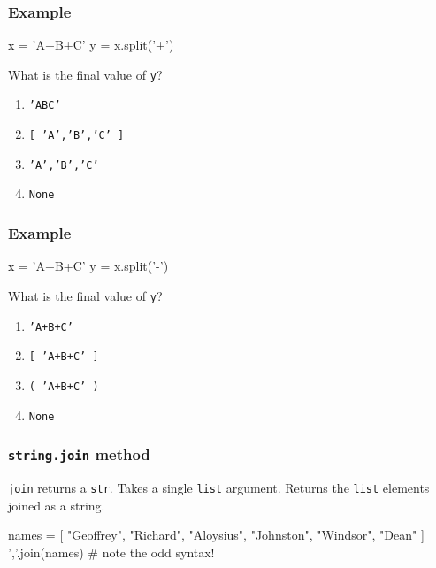 \documentclass[11pt]{beamer}
\begin{document}
\begin{frame}[fragile]
  \frametitle{Example}
  \Enlarge

  \begin{semiverbatim}
x = 'A+B+C'
y = x.split('+')
  \end{semiverbatim}
  What is the final value of \texttt{y}?
  \begin{enumerate}[label=\Alph*]
  \item  \texttt{'ABC'}
  \item  \texttt{[ 'A','B','C' ]}
  \item  \texttt{'A','B','C'}
  \item  \texttt{None}
  \end{enumerate}
\end{frame}

\begin{frame}[fragile]
  \frametitle{Example}
  \Enlarge

  \begin{semiverbatim}
x = 'A+B+C'
y = x.split('-')
  \end{semiverbatim}
  What is the final value of \texttt{y}?
  \begin{enumerate}[label=\Alph*]
  \item  \texttt{'A+B+C'}
  \item  \texttt{[ 'A+B+C' ]}
  \item  \texttt{( 'A+B+C' )}
  \item  \texttt{None}
  \end{enumerate}
\end{frame}

\begin{frame}[fragile]
  \frametitle{\texttt{string.join} method}
  \Enlarge

  \begin{itemize}
  \myitem  \texttt{join} returns a \texttt{str}.
  \myitem  Takes a single \texttt{list} argument.
  \myitem  Returns the \texttt{list} elements joined as a string.
  \end{itemize}
  \begin{semiverbatim}
names = [ "Geoffrey", "Richard", "Aloysius", "Johnston", "Windsor", "Dean" ]
','.join(names)     # note the odd syntax!
  \end{semiverbatim}
\end{frame}
\end{document}
